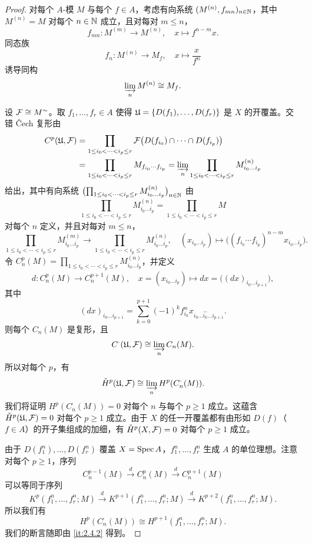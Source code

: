 \begin{proof}
对每个 $A$-模 $M$ 与每个 $f\in A$，考虑有向系统 $(M^{(n)},f_{mn})_{n\in\mathbb{N}}$，其中 $M^{(n)}=M$ 对每个 $n\in\mathbb{N}$ 成立，且对每对 $m\le n$，
\[
f_{mn}\colon M^{(m)}\to M^{(n)},\quad x\mapsto f^{n-m}x.
\]
同态族
\[
f_n\colon M^{(n)}\to M_f,\quad x\mapsto\frac{x}{f^n}
\]
诱导同构
\[
\varinjlim_n M^{(n)}\cong M_f.
\]

设 $\mathcal{F}\cong M^{\sim}$。取 $f_1,\dots,f_r\in A$ 使得 $\mathfrak{U}=\{D(f_1),\dots,D(f_r)\}$ 是 $X$ 的开覆盖。交错 \v{C}ech 复形由
\[
\begin{aligned}
C^p(\mathfrak{U},\mathcal{F})
&=\prod_{1\le i_0<\cdots<i_p\le r}\mathcal{F}\bigl(D(f_{i_0})\cap\cdots\cap D(f_{i_p})\bigr)\\
&=\prod_{1\le i_0<\cdots<i_p\le r}M_{f_{i_0}\cdots f_{i_p}}
=\varinjlim_n\prod_{1\le i_0<\cdots<i_p\le r}M^{(n)}_{i_0\dots i_p}
\end{aligned}
\]
给出，其中有向系统 $\bigl(\prod_{1\le i_0<\cdots<i_p\le r}M^{(n)}_{i_0\dots i_p}\bigr)_{n\in\mathbb{N}}$ 由
\[
\prod_{1\le i_0<\cdots<i_p\le r}M^{(n)}_{i_0\dots i_p}
=\prod_{1\le i_0<\cdots<i_p\le r}M
\]
对每个 $n$ 定义，并且对每对 $m\le n$，
\[
\prod_{1\le i_0<\cdots<i_p\le r}M^{(m)}_{i_0\dots i_p}
\to\prod_{1\le i_0<\cdots<i_p\le r}M^{(n)}_{i_0\dots i_p},\quad
(x_{i_0\dots i_p})\mapsto\bigl((f_{i_0}\cdots f_{i_p})^{n-m}x_{i_0\dots i_p}\bigr).
\]
令 $C^p_n(M)=\prod_{1\le i_0<\cdots<i_p\le r}M^{(n)}_{i_0\dots i_p}$，并定义
\[
d\colon C^p_n(M)\to C^{p+1}_n(M),\quad x=(x_{i_0\dots i_p})\mapsto dx=\bigl((dx)_{i_0\dots i_{p+1}}\bigr),
\]
其中
\[
(dx)_{i_0\dots i_{p+1}}=\sum_{k=0}^{p+1}(-1)^kf_{i_k}^nx_{i_0\dots\hat{i_k}\dots i_{p+1}}.
\]
则每个 $C_n(M)$ 是复形，且
\[
C^{\cdot}(\mathfrak{U},\mathcal{F})\cong\varinjlim_n C_n(M).
\]
所以对每个 $p$，有
\[
\check{H}^p(\mathfrak{U},\mathcal{F})\cong\varinjlim_n H^p(C_n^{\cdot}(M)).
\]
我们将证明 $H^p(C_n^{\cdot}(M))=0$ 对每个 $n$ 与每个 $p\ge 1$ 成立。这蕴含 $\check{H}^p(\mathfrak{U},\mathcal{F})=0$ 对每个 $p\ge 1$ 成立。由于 $X$ 的任一开覆盖都有由形如 $D(f)$（$f\in A$）的开子集组成的加细，有 $\check{H}^p(X,\mathcal{F})=0$ 对每个 $p\ge 1$ 成立。

由于 $D(f_1^n),\dots,D(f_r^n)$ 覆盖 $X=\operatorname{Spec} A$，$f_1^n,\dots,f_r^n$ 生成 $A$ 的单位理想。注意对每个 $p\ge 1$，序列
\[
C_n^{p-1}(M)\xrightarrow{\;d\;}C_n^p(M)\xrightarrow{\;d\;}C_n^{p+1}(M)
\]
可以等同于序列
\[
K^p(f_1^n,\dots,f_r^n;M)\xrightarrow{\;d\;}K^{p+1}(f_1^n,\dots,f_r^n;M)
\xrightarrow{\;d\;}K^{p+2}(f_1^n,\dots,f_r^n;M).
\]
所以我们有
\[
H^p(C_n^{\cdot}(M))\cong H^{p+1}(f_1^n,\dots,f_r^n;M).
\]
我们的断言随即由 \ref{it:2.4.2} 得到。
\end{proof}

